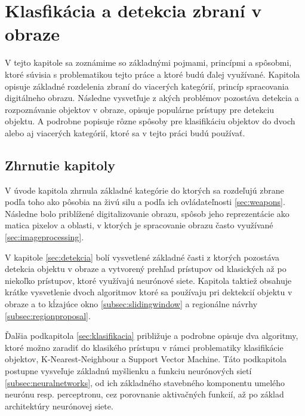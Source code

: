 
\chapter{Klasfikácia a detekcia zbraní v obraze}
\label{chap:technologie}

V tejto kapitole sa zoznámime so základnými pojmami, princípmi a spôsobmi, ktoré súvisia s problematikou tejto práce a ktoré budú ďalej využívané.
Kapitola opisuje základné rozdelenia zbraní do viacerých kategórií, princíp spracovania digitálneho obrazu.
Následne vysvetľuje z akých problémov pozostáva detekcia a rozpoznávanie objektov v obraze, opisuje populárne prístupy pre detekciu objektu.
A podrobne popisuje rôzne spôsoby pre klasifikáciu objektov do dvoch alebo aj viacerých kategórií, ktoré sa v tejto práci budú používať.













\section{Zhrnutie kapitoly}

V úvode kapitola zhrnula základné kategórie do ktorých sa rozdeľujú zbrane podľa toho ako pôsobia na živú silu a podľa ich ovládateľnosti \ref{sec:weapons}.
Následne bolo priblížené digitalizovanie obrazu, spôsob jeho reprezentácie ako matica pixelov a oblasti, v ktorých je spracovanie obrazu často využívané \ref{sec:imageprocessing}.

V kapitole \ref{sec:detekcia} bolí vysvetlené základné časti z ktorých pozostáva detekcia objektu v obraze a vytvorený prehľad prístupov od
    klasických až po niekoľko prístupov, ktoré využívajú neurónové siete.
Kapitola taktiež obsahuje krátke vysvetlenie dvoch algoritmov ktoré sa používaju pri dektekcií objektu v obraze a to kĺzajúce okno \ref{subsec:slidingwindow} a
    regionálne návrhy \ref{subsec:regionproposal}.

Ďalšia podkapitola \ref{sec:klasifikacia} približuje a podrobne opisuje dva algoritmy, ktoré možno zaradiť do klasikého prístupu v rámci problematiky klasifikácie objektov,
    K-Nearest-Neighbour a Support Vector Machine.
Táto podkapitola postupne vysveľuje základnú myšlienku a funkciu neurónových sietí \ref{subsec:neuralnetworks}, od ich základného stavebného komponentu umelého neurónu resp. perceptronu,
    cez porovnanie aktivačných funkcií, až po základ architektúry neurónovej siete.

